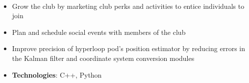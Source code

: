 \documentclass[10pt, letterpaper, ragged2e, withhyper]{altacv}
\begin{document}
\begin{paracol}{2}
    \divider
    
    \\







    \begin{itemize}
        \item Grow the club by marketing club perks and activities to entice individuals to join
        \item Plan and schedule social events with members of the club
    \end{itemize}

    \divider
    
    \begin{itemize}
        \item Improve precision of hyperloop pod's position estimator by reducing errors in the Kalman filter and 
        coordinate system conversion modules
        \item \textbf{Technologies}: C++, Python 
    \end{itemize}


\end{paracol}
\end{document}
